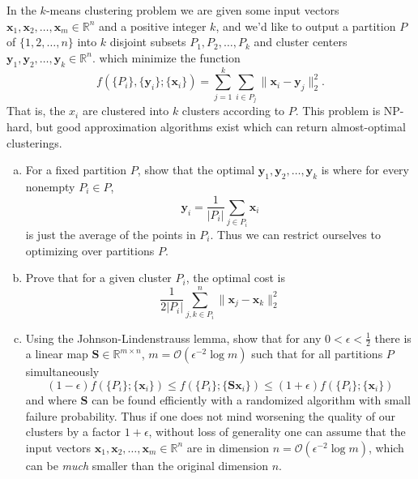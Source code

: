 \documentclass[12pt,letterpaper,cm]{hmcpset}
\newcommand\x{\boldsymbol{x}}
\newcommand\y{\boldsymbol{y}}
\renewcommand\S{\boldsymbol{S}}
\begin{document}
\begin{problem}
    In the $k$-means clustering problem we are given some input vectors
    $\x_1,\x_2,\ldots,\x_m\in\mathbb{R}^n$ and a positive integer $k$,
    and we'd like to output a partition $P$ of $\{1,2,\ldots,n\}$ into $k$
    disjoint subsets $P_1,P_2,\ldots,P_k$ and cluster centers $\y_1,\y_2,\ldots,\y_k\in\mathbb{R}^n$.
    which minimize the function
    \[
        f(\{P_i\},\{\y_i\};\{\x_i\}) = \sum_{j=1}^k \sum_{i\in P_j} \bigl\| \x_i - \y_j \bigr\|_2^2.
    \]
    That is, the $x_i$ are clustered into $k$ clusters according to $P$. This problem is NP-hard,
    but good approximation algorithms exist which can return almost-optimal clusterings.
\begin{enumerate}[(a)]
    \item For a fixed partition $P$, show that the optimal $\y_1,\y_2,\ldots,\y_k$ is where
        for every nonempty $P_i\in P$, $$\y_i = \frac{1}{|P_i|}\sum_{j\in P_i} \x_i$$ is just
        the average of the points in $P_i$. Thus we can restrict ourselves to optimizing over
        partitions $P$.
    \item Prove that for a given cluster $P_i$, the optimal cost is
        \[
            \frac{1}{2|P_i|}\sum_{j,k\in P_i}^n \|\x_j-\x_k\|_2^2
        \]
    \item Using the Johnson-Lindenstrauss lemma, show that for any $0 < \epsilon < \tfrac{1}{2}$
        there is a linear map $\S\in\mathbb{R}^{m\times n}$, $m = \mathcal{O}(\epsilon^{-2}\log m)$
        such that for all partitions $P$ simultaneously
        \[
            (1-\epsilon)f(\{P_i\};\{\x_i\}) \leq f(\{P_i\};\{\S\x_i\}) \leq (1+\epsilon)f(\{P_i\};\{\x_i\})
        \]
        and where $\S$ can be found efficiently with a randomized algorithm with small failure probability.
        Thus if one does not mind worsening the quality of our clusters by a factor $1+\epsilon$, without
        loss of generality one can assume that the input vectors $\x_1,\x_2,\ldots,\x_m\in\mathbb{R}^n$
        are in dimension $n = \mathcal{O}(\epsilon^{-2} \log m)$, which can be \emph{much} smaller than the
        original dimension $n$.
\end{enumerate}
\end{problem}

\begin{solution}
    \vfill
\end{solution}
\end{document}
